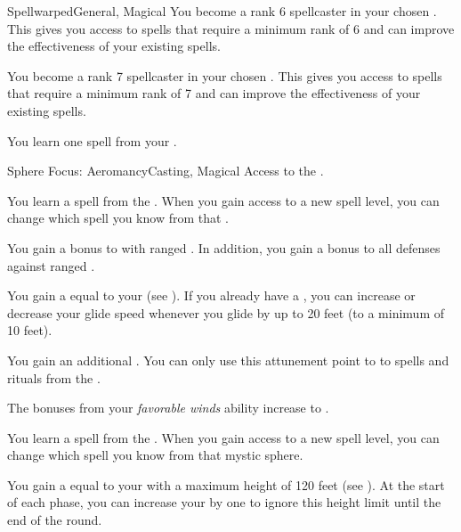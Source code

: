 \begin{feat}{Spellwarped}{General, Magical}
         You become a rank 6 spellcaster in your chosen .
        This gives you access to spells that require a minimum rank of 6 and can improve the effectiveness of your existing spells.

         You become a rank 7 spellcaster in your chosen .
        This gives you access to spells that require a minimum rank of 7 and can improve the effectiveness of your existing spells.

         You learn one spell from your .
    \end{feat}

    \begin{feat}{Sphere Focus: Aeromancy}{Casting, Magical}
        \featpre Access to the  .

         You learn a spell from the  .
        When you gain access to a new spell level, you can change which spell you know from that .

         You gain a  bonus to  with ranged .
        In addition, you gain a  bonus to all defenses against ranged .

         You gain a  equal to your  (see ).
        If you already have a , you can increase or decrease your glide speed whenever you glide by up to 20 feet (to a minimum of 10 feet).

         You gain an additional .
        You can only use this attunement point to  to spells and rituals from the  .

         The bonuses from your \textit{favorable winds} ability increase to .

         You learn a spell from the  .
        When you gain access to a new spell level, you can change which spell you know from that mystic sphere.

         You gain a  equal to your  with a maximum height of 120 feet (see ).
        At the start of each phase, you can increase your  by one to ignore this height limit until the end of the round.
    \end{feat}

